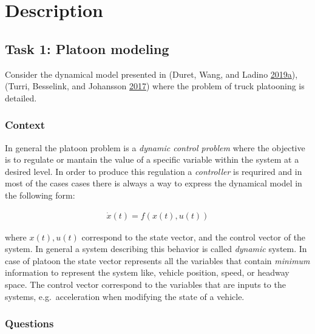 \documentclass[]{book}
\theoremstyle{definition}
\theoremstyle{definition}
\theoremstyle{definition}
\theoremstyle{remark}
\begin{document}
\hypertarget{description-1}{%
\section*{Description}\label{description-1}}

\hypertarget{task-1-platoon-modeling}{%
\subsection*{Task 1: Platoon modeling}\label{task-1-platoon-modeling}}

Consider the dynamical model presented in (Duret, Wang, and Ladino
\protect\hyperlink{ref-Duret2019:ISTTT}{2019}\protect\hyperlink{ref-Duret2019:ISTTT}{a}),
(Turri, Besselink, and Johansson
\protect\hyperlink{ref-Turri2017}{2017}) where the problem of truck
platooning is detailed.

\hypertarget{context-5}{%
\subsubsection*{Context}\label{context-5}}

In general the platoon problem is a \emph{dynamic control problem} where
the objective is to regulate or mantain the value of a specific variable
within the system at a desired level. In order to produce this
regulation a \emph{controller} is requrired and in most of the cases
cases there is always a way to express the dynamical model in the
following form:

\begin{align}
\dot{x}(t) = f(x(t), u(t)) \label{eq:platoon}
\end{align}

where \(x(t), u(t)\) correspond to the state vector, and the control
vector of the system. In general a system describing this behavior is
called \emph{dynamic} system. In case of platoon the state vector
represents all the variables that contain \emph{minimum} information to
represent the system like, vehicle position, speed, or headway space.
The control vector correspond to the variables that are inputs to the
systems, e.g.~acceleration when modifying the state of a vehicle.

\hypertarget{questions-4}{%
\subsubsection*{Questions}\label{questions-4}}
\end{document}
